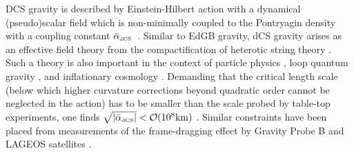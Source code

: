 \documentclass[prd,twocolumn,nofootinbib]{revtex4-1}
\newcommand{\DCS}{{\mbox{\tiny dCS}}}
\begin{document}
DCS gravity is described by Einstein-Hilbert action with a dynamical (pseudo)scalar field which is non-minimally coupled to the Pontryagin density with a coupling constant $\bar{\alpha}_{\DCS}$~\cite{Alexander:2009tp,Jackiw:2003pm}. Similar to EdGB gravity, dCS gravity arises as an effective field theory from the compactification of  heterotic string theory \cite{GREEN1984117,McNees:2015srl}. Such a theory is also important in the context of particle physics \cite{Alexander:2009tp,Mariz:2004cv,MARIZ2008312,PhysRevD.78.025029}, loop quantum gravity  \cite{PhysRevD.80.104007,Taveras:2008yf}, and inflationary cosmology \cite{Weinberg:2008hq}. Demanding that the critical length scale (below which higher curvature corrections beyond quadratic order cannot be neglected in the action) has to be smaller than the scale probed by table-top experiments, one finds $\sqrt{|\bar{\alpha}_{\DCS}|} < \mathcal{O}(10^8 \text{km})$ \cite{Yagi:2012ya}. Similar constraints have been placed from measurements of the frame-dragging effect by Gravity Probe B and LAGEOS satellites \cite{AliHaimoud:2011fw}.

\end{document}
